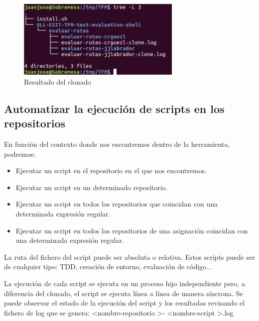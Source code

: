 		\begin{figure}[H]
		\begin{center}
		\includegraphics[width=0.7\textwidth]{images/ghshell6-2}
		\caption{Resultado del clonado}
		\label{fig:ghshell6-2}
		\end{center}
		\end{figure}
	
\subsection{Automatizar la ejecución de scripts en los repositorios}
\label{subsec:3.1.3} 
	    
    En función del contexto donde nos encontremos dentro de la herramienta, podremos:
    \begin{itemize}
    	\item Ejecutar un script en el repositorio en el que nos encontremos.
    	\item Ejecutar un script en un determinado repositorio.
	    \item Ejecutar un script en todos los repositorios que coincidan con una determinada expresión regular.
	    \item Ejecutar un script en todos los repositorios de una asignación coincidan con una determinada expresión regular.
    \end{itemize}
    
	La ruta del fichero del script puede ser absoluta o relativa. Estos scripts puede ser de cualquier tipo: TDD, creación de entorno, evaluación de código...
\bigskip

	La ejecución de cada script se ejecuta en un proceso hijo independiente pero, a diferencia del clonado, el script se ejecuta línea a línea de manera síncrona. Se puede observar el estado de la ejecución del script y los resultados revisando el fichero de log que se genera: \textless nombre-repositorio \textgreater - \textless nombre-script \textgreater .log
    	
